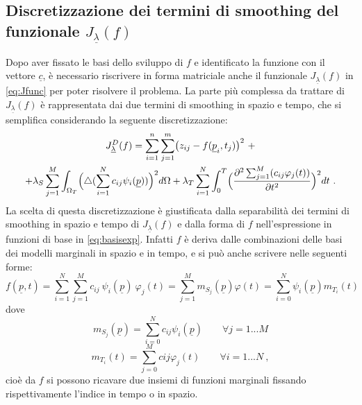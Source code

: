 \documentclass[a4paper,11pt,twoside,openright]{book}							%
\begin{document}
\subsection*{Discretizzazione dei termini di smoothing del funzionale $J_{\underline \lambda }(f)$}
Dopo aver fissato le basi dello sviluppo di $f$ e identificato la funzione con il vettore $\underline c$, è necessario riscrivere in forma matriciale anche il funzionale $J_{\underline \lambda }(f)$ in \ref{eq:Jfunc} per poter risolvere il problema. La parte più complessa da trattare di $J_{\underline \lambda }(f)$ è rappresentata dai due termini di smoothing in spazio e tempo, che si semplifica considerando la seguente discretizzazione:
\begin{multline}
\label{eq:penalizzdisc}
J_{\underline \lambda }^D(f)=\sum_{i=1}^n \sum_{j=1}^m \bigl( z_{ij} - f(\underline p_i,t_j) \bigr)^2 \ + \\
+\lambda_S  \sum_{j=1}^M \int_{\Omega_T} \Bigl( \triangle(\sum_{i=1}^N  c_{ij}\psi_i (\underline p)) \Bigr)^2 d \Omega + \lambda_T \sum_{i=1}^N\int_0^T \Bigl( \frac{\partial^2 \sum_{j=1}^M(c_{ij}\varphi_j(t)) }{\partial t ^2} \Bigr)^2 dt \ .
\end{multline}
La scelta di questa discretizzazione è giustificata dalla separabilità dei termini di smoothing in spazio e tempo di $J_{\underline \lambda }(f)$ e dalla forma di $f$ nell'espressione in funzioni di base in \ref{eq:basisexp}. Infatti $f$ è deriva dalle combinazioni delle basi dei modelli marginali in spazio e in tempo, e si può anche scrivere nelle seguenti forme:
$$
f(\underline p,t)=\sum_{i=1}^N \sum_{j=1}^M c_{ij}\ \psi_i(\underline p)\ \varphi_j(t)=\sum_{j=1}^Mm_{S_j}(\underline p)\varphi(t)=\sum_{i=0}^N\psi_i(\underline p)m_{T_i}(t)
$$
dove
$$
m_{S_j}(\underline p)=\sum_{i=0}^Nc_{ij}\psi_i(\underline p) \qquad \forall j=1...M
$$
$$
m_{T_i}(t)=\sum_{j=0}^Mc{ij}\varphi_j(t) \qquad \forall i=1...N \ ,
$$
cioè da $f$ si possono ricavare due insiemi di funzioni marginali fissando rispettivamente l'indice in tempo o in spazio.
\end{document}
